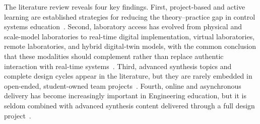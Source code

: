 \documentclass[journal]{IEEEtran}
\begin{document}
The literature review reveals four key findings. First, project-based and active learning are established strategies for reducing the theory--practice gap in control systems education~\cite{wellstead1990,kim2011lego,podrzaj2005,spong2005,chevalier2021studentFeedbackEducationalInnovationControl,soares2014,chaconvasquez2024digitalControlEducation}. Second, laboratory access has evolved from physical and scale-model laboratories to real-time digital implementation, virtual laboratories, remote laboratories, and hybrid digital-twin models, with the common conclusion that these modalities should complement rather than replace authentic interaction with real-time systems~\cite{wellstead1990,kim2011lego,podrzaj2005,walker1980,lim2005,dunnigan2001,kassas2008unifiedApproachClassroomLaboratoryControl,granado2007webBasedVirtualLaboratoryAutomaticControl,sanchez2004,ionescu2013,buiu2008,ghazi2024djiTelloEducationalControl,qinghua2014,quanser2021yorkhybridlab,quanser2022calgaryhybridlearning,quanser2022bitpblcontrols,mohammadi2025stralsundhybridlabs,mohammadi2025epflremotelabs}. Third, advanced synthesis topics and complete design cycles appear in the literature, but they are rarely embedded in open-ended, student-owned team projects~\cite{dunnigan2001,kassas2008unifiedApproachClassroomLaboratoryControl,serbezov2022openAccessResourcesFeedbackDynamicsControl,dorato1990}. Fourth, online and asynchronous delivery has become increasingly important in Engineering education, but it is seldom combined with advanced synthesis content delivered through a full design project~\cite{chaconvasquez2024digitalControlEducation,buiu2008,serbezov2022openAccessResourcesFeedbackDynamicsControl,quanser2021yorkhybridlab,quanser2022calgaryhybridlearning,quanser2022bitpblcontrols,mohammadi2025stralsundhybridlabs,mohammadi2025epflremotelabs}.

\end{document}
